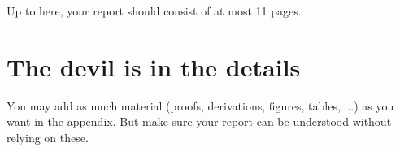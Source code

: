 \documentclass[a4paper,UKenglish,cleveref, autoref]{lipics-v2019}
\begin{document}
Up to here, your report should consist of at most 11 pages.

\clearpage


\appendix
\section{The devil is in the details}

You may add as much material (proofs, derivations, figures, tables, ...) as you want in the appendix. But make sure your report can be understood without relying on these.
\end{document}
